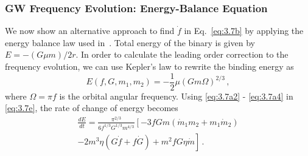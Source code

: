 \documentclass[prd,twocolumn,nofootinbib]{revtex4-1}
\begin{document}
 \subsubsection*{GW Frequency Evolution: Energy-Balance Equation}
 
  \hspace{15.5pt} We now show an alternative approach to find $\dot f$ in Eq.~\eqref{eq:3.7b} by applying the energy balance law used in~\cite{Yunes:2009bv}. Total energy of the binary is given by $E=-(G\mu m)/2r$. In order to calculate the leading order correction to the frequency evolution, we can use Kepler's law to rewrite the binding energy as 
 \begin{equation}\label{eq:3.7e}
 E(f,G,m_1,m_2)=-\frac{1}{2}\mu (Gm\Omega)^{2/3}\,,
 \end{equation}
 where $\Omega=\pi f$ is the orbital angular frequency. Using \eqref{eq:3.7a2} - \eqref{eq:3.7a4} in  \eqref{eq:3.7e}, the rate of change of energy becomes
 \begin{align}\label{eq:3.7j}
 \frac{d E}{d t}=\frac{\pi^{2/3}}{6f^{1/3}G^{1/3}m^{4/3}}\left[-3fGm(\dot{m}_1m_2+m_1\dot{m}_2)\right.\nonumber\\ \left.-2m^3\eta(G\dot{f}+f\dot{G})+m^2fG\eta\dot{m}\right]\,.
 \end{align}
 
\end{document}
